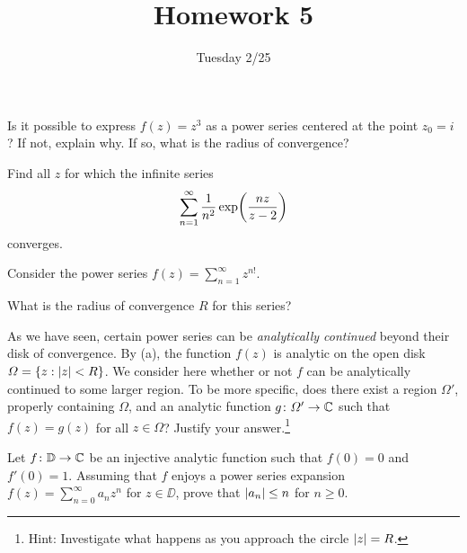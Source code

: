 \documentclass{../math135}
\title{Homework 5}
\author{}
\date{Tuesday 2/25}
\begin{document}
\begin{exercise}
	Is it possible to express \(f(z) = z^3\) as a power series centered
  at the point \(z_0 = i\)?  If not, explain why.  If so, what is the
  radius of convergence?

  \begin{solution}

  \end{solution}

\end{exercise}

\begin{exercise}
	Find all \(z\) for which the infinite series
  \[
		\sum_{n=1}^ \infty \frac{1}{n^2} \exp \prn*{\frac{nz}{z-2}}
  \]
	converges.

  \begin{solution}

  \end{solution}

\end{exercise}

\begin{exercise}
	Consider the power series \(f(z) = \sum_{n=1}^\infty z^{n!}\).
	\begin{problems}
  \item What is the radius of convergence \(R\) for this series?

    \begin{solution}

    \end{solution}

  \item As we have seen, certain power series can be
    \emph{analytically continued} beyond their disk of convergence.
    By (a), the function \(f(z)\) is analytic on the open disk
    \(\Omega = \{ z : \lvert z\rvert < R\}\).  We consider here whether or not
    \(f\) can be analytically continued to some larger region.  To be
    more specific, does there exist a region \(\Omega'\), properly
    containing \(\Omega\), and an analytic function
    \(g \colon \Omega' \to \mathbb C\) such that \(f(z) = g(z)\) for all
    \(z \in \Omega\)?  Justify your answer.\footnote{Hint: Investigate
      what happens as you approach the circle \(\lvert z\rvert = R\).}

    \begin{solution}

    \end{solution}

	\end{problems}
\end{exercise}

\begin{exercise}[optional]
  Let \(f \colon \mathbb D \to \mathbb C\) be an injective analytic function such
  that \(f(0) = 0\) and \(f'(0) = 1\).  Assuming that \(f\) enjoys a
  power series expansion \(f(z) = \sum_{n=0}^\infty a_n z^n\) for
  \(z \in \DD\), prove that \(\lvert a_n\rvert \le n\) for \(n \ge 0\).

  \begin{solution}

  \end{solution}
\end{exercise}
\end{document}
